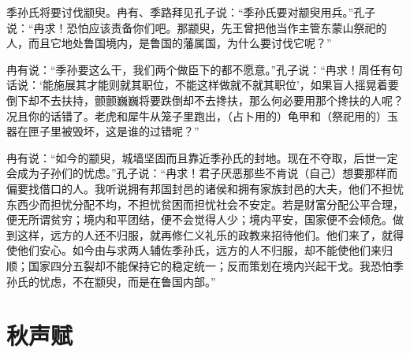 \documentclass[12pt,UTF-8,openany,a4]{ctexbook}
\begin{document}
\begin{large}\yiwen
    
    季孙氏将要讨伐颛臾。冉有、季路拜见孔子说：“季孙氏要对颛臾用兵。”孔子说：“冉求！恐怕应该责备你们吧。那颛臾，先王曾把他当作主管东蒙山祭祀的人，而且它地处鲁国境内，是鲁国的藩属国，为什么要讨伐它呢？”
    
    冉有说：“季孙要这么干，我们两个做臣下的都不愿意。”孔子说：“冉求！周任有句话说：‘能施展其才能则就其职位，不能这样做就不就其职位’，如果盲人摇晃着要倒下却不去扶持，颤颤巍巍将要跌倒却不去搀扶，那么何必要用那个搀扶的人呢？况且你的话错了。老虎和犀牛从笼子里跑出，（占卜用的）龟甲和（祭祀用的）玉器在匣子里被毁坏，这是谁的过错呢？”
    
    冉有说：“如今的颛臾，城墙坚固而且靠近季孙氏的封地。现在不夺取，后世一定会成为子孙们的忧虑。”孔子说：“冉求！君子厌恶那些不肯说（自己）想要那样而偏要找借口的人。我听说拥有邦国封邑的诸侯和拥有家族封邑的大夫，他们不担忧东西少而担忧分配不均，不担忧贫困而担忧社会不安定。若是财富分配公平合理，便无所谓贫穷；境内和平团结，便不会觉得人少；境内平安，国家便不会倾危。做到这样，远方的人还不归服，就再修仁义礼乐的政教来招待他们。他们来了，就得使他们安心。如今由与求两人辅佐季孙氏，远方的人不归服，却不能使他们来归顺；国家四分五裂却不能保持它的稳定统一；反而策划在境内兴起干戈。我恐怕季孙氏的忧虑，不在颛臾，而是在鲁国内部。”
    

\end{large}



\chapter{秋声赋}
\end{document}

